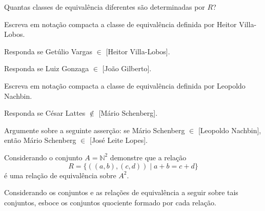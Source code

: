 \begin{exerList}
	\item Quantas classes de equivalência diferentes são determinadas por $R$?
	\item Escreva em notação compacta a classe de equivalência definida por Heitor Villa-Lobos.
	\item Responda se Getúlio Vargas $\in$ [Heitor Villa-Lobos].
	\item Responda se Luiz Gonzaga $\in$ [João Gilberto].
	\item Escreva em notação compacta a classe de equivalência definida por Leopoldo Nachbin.
	\item Responda se César Lattes $\notin$ [Mário Schenberg].
	\item Argumente sobre a seguinte asserção: se Mário Schenberg $\in$ [Leopoldo Nachbin], então Mário Schenberg $\in$ [José Leite Lopes].
\end{exerList}

\begin{questao}\label{test:EquivalenciaOrdem2}
	Considerando o conjunto $A = \mathbb{N}^2$ demonstre que a relação 
  $$R = \{((a, b), (c, d)) \mid a+b = c+d\}$$ 
  é uma relação de equivalência sobre $A^2$.
\end{questao}

\begin{questao}\label{test:EquivalenciaOrdem3}
	Considerando os conjuntos e as relações de equivalência a seguir sobre tais conjuntos, esboce os conjuntos quociente formado por cada relação.
\end{questao}

